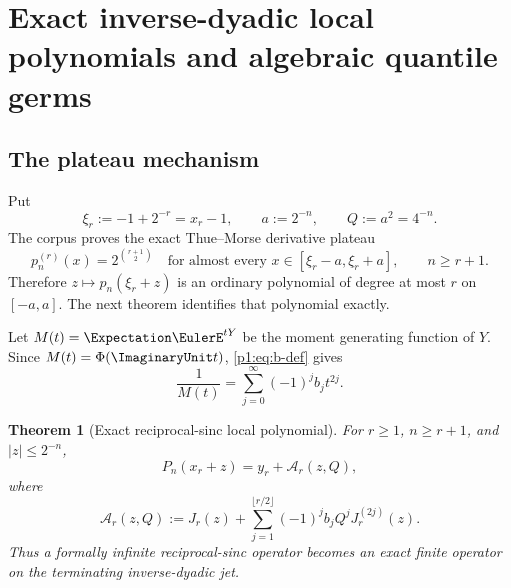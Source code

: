 \documentclass[11pt,oneside]{article}
\numberwithin{equation}{section}
\newtheorem{theorem}{Theorem}[section]
\theoremstyle{definition}
\theoremstyle{remark}
\newcommand{\Fn}{P_n}
\begin{document}
\section{Exact inverse-dyadic local polynomials and algebraic quantile germs}
\label{p1:sec:exact-local}

\subsection{The plateau mechanism}

Put
\begin{equation}
 \xi_r:=-1+2^{-r}=x_r-1,
 \qquad a:=2^{-n},\qquad Q:=a^2=4^{-n}.
 \label{p1:eq:xi-a-Q}
\end{equation}
The corpus proves the exact Thue--Morse derivative plateau
\begin{equation}
 p_n^{(r)}(x)=2^{\binom{r+1}{2}}
 \quad\text{for almost every }x\in[\xi_r-a,\xi_r+a],
 \qquad n\ge r+1.
 \label{p1:eq:plateau-imported}
\end{equation}
Therefore $z\mapsto p_n(\xi_r+z)$ is an ordinary polynomial of degree at most
$r$ on $[-a,a]$.  The next theorem identifies that polynomial exactly.

Let $M(t)=\Expectation\EulerE^{tY}$ be the moment generating function of $Y$.  Since
$M(t)=\Phi(\ImaginaryUnit t)$, \eqref{p1:eq:b-def} gives
\begin{equation}
 \frac1{M(t)}=\sum_{j=0}^{\infty}(-1)^jb_jt^{2j}.
 \label{p1:eq:reciprocal-MGF}
\end{equation}

\begin{theorem}[Exact reciprocal-sinc local polynomial]
\label{p1:thm:exact-local-polynomial}
For $r\ge1$, $n\ge r+1$, and $|z|\le2^{-n}$,
\begin{equation}
 \boxed{
 \Fn(x_r+z)=y_r+\mathcal A_r(z,Q),}
 \label{p1:eq:exact-local-Pn}
\end{equation}
where
\begin{equation}
 \boxed{
 \mathcal A_r(z,Q):=
 J_r(z)+\sum_{j=1}^{\lfloor r/2\rfloor}
 (-1)^jb_jQ^jJ_r^{(2j)}(z).}
 \label{p1:eq:Ar-def}
\end{equation}
Thus a formally infinite reciprocal-sinc operator becomes an exact finite operator on the
terminating inverse-dyadic jet.
\end{theorem}
\end{document}
